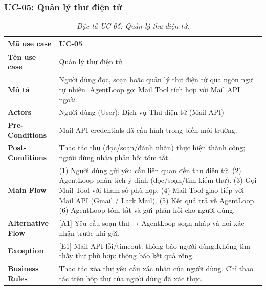 \subsubsection{UC-05: Quản lý thư điện tử}
\label{subsec:spec-uc05}
\renewcommand{\arraystretch}{1.4}
\begin{longtable}{|>{\bfseries}p{3.5cm}|p{10.5cm}|}
  \caption{\emph{Đặc tả UC-05: Quản lý thư điện tử.}} \label{tab:spec-uc05} \\
  \hline
  Mã use case      & UC-05 \\ \hline
  Tên use case     & Quản lý thư điện tử \\ \hline
  Mô tả            & Người dùng đọc, soạn hoặc quản lý thư điện tử qua ngôn ngữ tự nhiên. AgentLoop gọi Mail Tool tích hợp với Mail API ngoài. \\ \hline
  Actors           & Người dùng (User); Dịch vụ Thư điện tử (Mail API) \\ \hline
  Pre-Conditions   & Mail API credentials đã cấu hình trong biến môi trường. \\ \hline
  Post-Conditions  & Thao tác thư (đọc/soạn/đánh nhãn) thực hiện thành công; người dùng nhận phản hồi tóm tắt. \\ \hline
  Main Flow        & (1) Người dùng gửi yêu cầu liên quan đến thư điện tử.\newline
                     (2) AgentLoop phân tích ý định (đọc/soạn/tìm kiếm thư).\newline
                     (3) Gọi Mail Tool với tham số phù hợp.\newline
                     (4) Mail Tool giao tiếp với Mail API (Gmail / Lark Mail).\newline
                     (5) Kết quả trả về AgentLoop.\newline
                     (6) AgentLoop tóm tắt và gửi phản hồi cho người dùng. \\ \hline
  Alternative Flow & [A1] Yêu cầu soạn thư → AgentLoop soạn nháp và hỏi xác nhận trước khi gửi. \\ \hline
  Exception        & [E1] Mail API lỗi/timeout: thông báo người dùng.\newline
                     [E2] Không tìm thấy thư phù hợp: thông báo kết quả rỗng. \\ \hline
  Business Rules   & Thao tác xóa thư yêu cầu xác nhận của người dùng.\newline
                     Chỉ thao tác trên hộp thư của người dùng đã xác thực. \\ \hline
\end{longtable}

